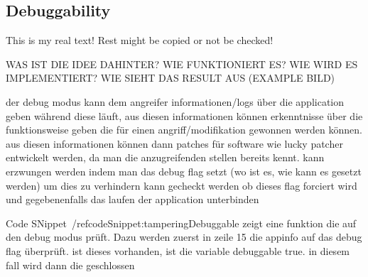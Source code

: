 \subsection{Debuggability} \label{subsection:subsection:counter-tampering-debuggable}
This is my real text! Rest might be copied or not be checked!



WAS IST DIE IDEE DAHINTER? WIE FUNKTIONIERT ES? WIE WIRD ES IMPLEMENTIERT? WIE SIEHT DAS RESULT AUS (EXAMPLE BILD)\newline

der debug modus kann dem angreifer informationen/logs über die application geben während diese läuft, aus diesen informationen können erkenntnisse über die funktionsweise geben die für einen angriff/modifikation gewonnen werden können. aus diesen informationen können dann patches für software wie lucky patcher entwickelt werden, da man die anzugreifenden stellen bereits kennt.
kann erzwungen werden indem man das debug flag setzt (wo ist es, wie kann es gesetzt werden)\newline
um dies zu verhindern kann gecheckt werden ob dieses flag forciert wird und gegebenenfalls das laufen der application unterbinden\newline



 Code SNippet~/ref{codeSnippet:tamperingDebuggable} zeigt eine funktion die auf den debug modus prüft. Dazu werden zuerst in zeile 15 die appinfo auf das debug flag überprüft. ist dieses vorhanden, ist die variable debuggable true. in diesem fall wird dann die geschlossen\newline

